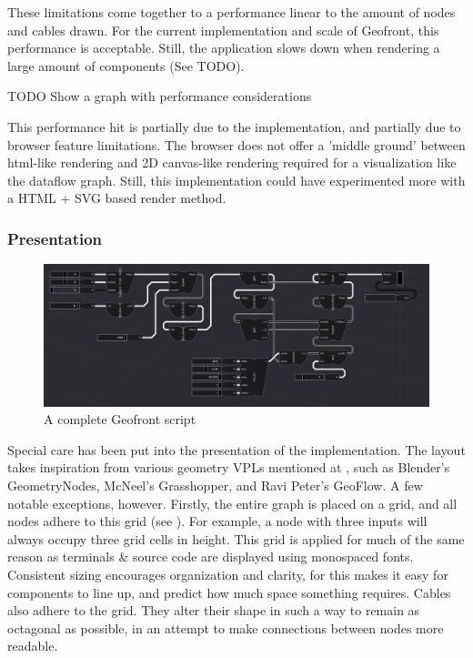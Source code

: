 These limitations come together to a performance linear to the amount of nodes and cables drawn. For the current implementation and scale of Geofront, this performance is acceptable.  
Still, the application slows down when rendering a large amount of components (See TODO). 

\begin{note}
  TODO Show a graph with performance considerations
\end{note}

This performance hit is partially due to the implementation, and partially due to browser feature limitations. 
The browser does not offer a 'middle ground' between html-like rendering and 2D canvas-like rendering required for a visualization like the dataflow graph. 
Still, this implementation could have experimented more with a HTML + SVG based render method.

\subsubsection*{Presentation}

\begin{figure}
  \centering
  \graphicspath{ {../../assets/images/implementation/} }
  \includegraphics[width=\linewidth]{a-full-graph.png}
  \caption[Shim Classes]{A complete Geofront script}
  \label{fig:a-full-graph}
\end{figure}

Special care has been put into the presentation of the implementation.
The layout takes inspiration from various geometry VPLs mentioned at , such as Blender's GeometryNodes, McNeel's Grasshopper, and Ravi Peter's GeoFlow. 
A few notable exceptions, however. 
Firstly, the entire graph is placed on a grid, and all nodes adhere to this grid (see ). 
For example, a node with three inputs will always occupy three grid cells in height. 
This grid is applied for much of the same reason as terminals \& source code are displayed using monospaced fonts. 
Consistent sizing encourages organization and clarity, for this makes it easy for components to line up, and predict how much space something requires.  
Cables also adhere to the grid. They alter their shape in such a way to remain as octagonal as possible, in an attempt to make connections between nodes more readable.

